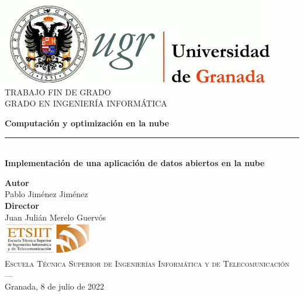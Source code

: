 \begin{titlepage}
\newlength{\centeroffset}
\setlength{\centeroffset}{-0.5\oddsidemargin}
\addtolength{\centeroffset}{0.5\evensidemargin}
\thispagestyle{empty}

\noindent\hspace*{\centeroffset}\begin{minipage}{\textwidth}

\centering
\includegraphics[width=0.9\textwidth]{doc/logos/logo_ugr.jpg}\\[1.4cm]

\textsc{ \Large TRABAJO FIN DE GRADO\\[0.2cm]}
\textsc{ GRADO EN INGENIERÍA INFORMÁTICA}\\[1cm]

\vspace{2cm}

{\Huge\bfseries Computación y optimización en la nube \\}
\noindent\rule[-1ex]{\textwidth}{3pt}\\[3.5ex]
{\large\bfseries Implementación de una aplicación de datos abiertos en la nube }
\end{minipage}


\noindent\hspace*{\centeroffset}
\begin{minipage}{\textwidth}
\centering

\textbf{Autor}\\ {Pablo Jiménez Jiménez}\\[2.5ex]
\textbf{Director}\\ {Juan Julián Merelo Guervós}\\[2cm]
\includegraphics[width=0.3\textwidth]{doc/logos/etsiit_logo.png}\\[0.1cm]
\textsc{Escuela Técnica Superior de Ingenierías Informática y de Telecomunicación}\\
\textsc{---}\\
Granada, 8 de julio de 2022
\end{minipage}
\end{titlepage}
